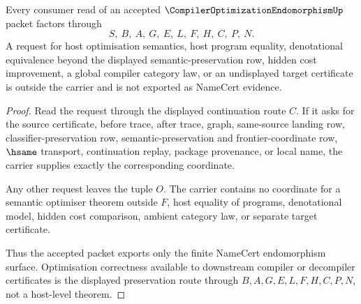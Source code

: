 \begin{theorem}
\label{thm:compiler-optimization-endomorphism-nonescape}
Every consumer read of an accepted $\CompilerOptimizationEndomorphismUp$ packet factors through
$$
S,\ B,\ A,\ G,\ E,\ L,\ F,\ H,\ C,\ P,\ N.
$$
A request for host optimisation semantics, host program equality, denotational equivalence beyond the displayed semantic-preservation row, hidden cost improvement, a global compiler category law, or an undisplayed target certificate is outside the carrier and is not exported as NameCert evidence.
\end{theorem}
\begin{proof}
Read the request through the displayed continuation route $C$. If it asks for the source certificate, before trace, after trace, graph, same-source landing row, classifier-preservation row, semantic-preservation and frontier-coordinate row, $\hsame$ transport, continuation replay, package provenance, or local name, the carrier supplies exactly the corresponding coordinate.

Any other request leaves the tuple $O$. The carrier contains no coordinate for a semantic optimiser theorem outside $F$, host equality of programs, denotational model, hidden cost comparison, ambient category law, or separate target certificate.

Thus the accepted packet exports only the finite NameCert endomorphism surface. Optimisation correctness available to downstream compiler or decompiler certificates is the displayed preservation route through $B,A,G,E,L,F,H,C,P,N$, not a host-level theorem.
\end{proof}

\begin{closurestatus}{\CompilerOptimizationEndomorphismUp}
  \theoryclosure{\seedClosure}
  \formalstatus{\unformalizedV}
\end{closurestatus}
